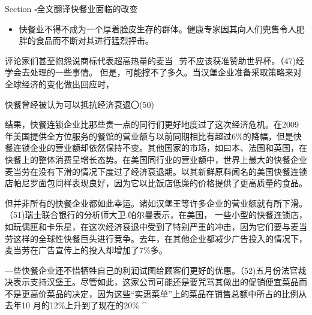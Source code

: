 \documentclass[UTF8,11pt]{ctexart}
\begin{document}
Section \(\square\)全文翻译快餐业面临的改变


\begin{itemize}[leftmargin=2em,itemsep=.2em,topsep=.4em]\item[A.] 快餐业不得不成为一个厚着脸皮生存的群体。健康专家因其向人们兜售令人肥胖的食品而不断对其进行猛烈抨击。
\end{itemize}

评论家们甚至抱怨说商标代表超高热量的麦当\_劳不应该获准赞助世界杯。（47)经学会去处理的一些事情。 但是，可能撑不了多久。当汉堡企业准备采取策略来对全球经济的变化做出回应时，




快餐曾经被认为可以抵抗经济衰退〇(50) 


结果，快餐连锁企业比那些贵一点的同行们更好地度过了这次经济危机。在2009 年美国提供全方位服务的餐馆的营业额与以前同期相比有超过6\%的降幅，但是快餐连锁企业的营业额却依然保持不变。其他国家的市场，如曰本、法国和英国，在快餐上的整体消费呈增长态势。在美国同行业的营业额中，世界上最大的快餐企业麦当劳在没有下滑的情况下度过了经济衰退期。以其新鲜原料闻名的美国快餐连锁店帕尼罗面包同样表现良好，因为它以比饭店低廉的价格提供了更高质量的食品。


但并非所有的快餐企业都如此幸运。诸如汉堡王等许多企业的营业额就有所下滑。（51)瑞士联合银行的分析师大卫.帕尔曼表示，在美国， 一些小型的快餐连锁店，如玩偶匣和卡乐星，在这次经济衰退中受到了特别严重的冲击，因为它们要与麦当劳这样的全球性快餐巨头进行竞争。去年，在其他企业都减少广告投入的情况下，麦当劳在广告宣传上的投入却增加了7\%多。


—些快餐企业还不惜牺牲自己的利润试图给顾客们更好的优惠。（52)五月份法官裁决表示支持汉堡王。尽管如此，这家公司可能还是要咒骂其做出的促销便宜菜品而不是更高价菜品的决定，因为这些“实惠菜单”上的菜品在销售总额中所占的比例从去年10 月的12\%上升到了现在的20\% \textasciicircum{}
\end{document}
